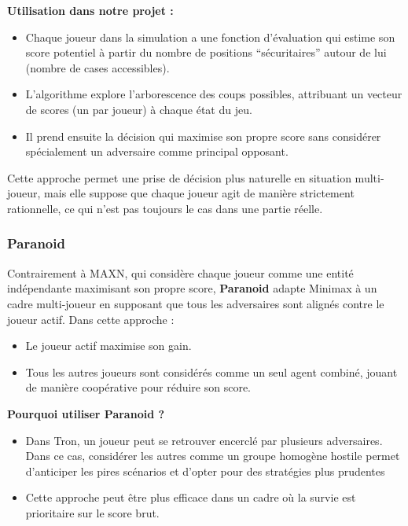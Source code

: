 \textbf{Utilisation dans notre projet :}
\begin{itemize}
    \item Chaque joueur dans la simulation a une fonction d'évaluation qui estime son score potentiel à partir du nombre de positions “sécuritaires” autour de lui (nombre de cases accessibles).
    \item L'algorithme explore l'arborescence des coups possibles, attribuant un vecteur de scores (un par joueur) à chaque état du jeu.
    \item Il prend ensuite la décision qui maximise son propre score sans considérer spécialement un adversaire comme principal opposant.
\end{itemize}
Cette approche permet une prise de décision plus naturelle en situation multi-joueur, mais elle suppose que chaque joueur agit de manière strictement rationnelle, ce qui n'est pas toujours le cas dans une partie réelle.

\subsubsection{Paranoid}
Contrairement à MAXN, qui considère chaque joueur comme une entité indépendante maximisant son propre score, \textbf{Paranoid} adapte Minimax à un cadre multi-joueur en supposant que tous les adversaires sont alignés contre le joueur actif.
Dans cette approche :
\begin{itemize}
    \item Le joueur actif maximise son gain.
    \item Tous les autres joueurs sont considérés comme un seul agent combiné, jouant de manière coopérative pour réduire son score.
\end{itemize}
\textbf{Pourquoi utiliser Paranoid ?}
\begin{itemize}
    \item Dans Tron, un joueur peut se retrouver encerclé par plusieurs adversaires. Dans ce cas, considérer les autres comme un groupe homogène hostile permet d'anticiper les pires scénarios et d'opter pour des stratégies plus prudentes
    \item Cette approche peut être plus efficace dans un cadre où la survie est prioritaire sur le score brut.
\end{itemize}

